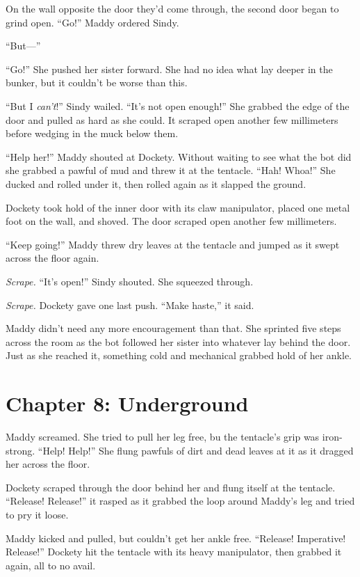\documentclass[10pt]{article}
\begin{document}
On the wall opposite the door they'd come through, the second door began
to grind open. ``Go!'' Maddy ordered Sindy.

``But---''

``Go!'' She pushed her sister forward. She had no idea what lay deeper
in the bunker, but it couldn't be worse than this.

``But I \emph{can't}!'' Sindy wailed. ``It's not open enough!'' She
grabbed the edge of the door and pulled as hard as she could. It scraped
open another few millimeters before wedging in the muck below them.

``Help her!'' Maddy shouted at Dockety. Without waiting to see what the
bot did she grabbed a pawful of mud and threw it at the tentacle. ``Hah!
Whoa!'' She ducked and rolled under it, then rolled again as it slapped
the ground.

Dockety took hold of the inner door with its claw manipulator, placed
one metal foot on the wall, and shoved. The door scraped open another
few millimeters.

``Keep going!'' Maddy threw dry leaves at the tentacle and jumped as it
swept across the floor again.

\emph{Scrape.} ``It's open!'' Sindy shouted. She squeezed through.

\emph{Scrape.} Dockety gave one last push. ``Make haste,'' it said.

Maddy didn't need any more encouragement than that. She sprinted five
steps across the room as the bot followed her sister into whatever lay
behind the door. Just as she reached it, something cold and mechanical
grabbed hold of her ankle.

\newpage
\section{Chapter 8: Underground}

Maddy screamed. She tried to pull her leg free, bu the tentacle's grip
was iron-strong. ``Help! Help!'' She flung pawfuls of dirt and dead
leaves at it as it dragged her across the floor.

Dockety scraped through the door behind her and flung itself at the
tentacle. ``Release! Release!'' it rasped as it grabbed the loop around
Maddy's leg and tried to pry it loose.

Maddy kicked and pulled, but couldn't get her ankle free. ``Release!
Imperative! Release!'' Dockety hit the tentacle with its heavy
manipulator, then grabbed it again, all to no avail.
\end{document}
